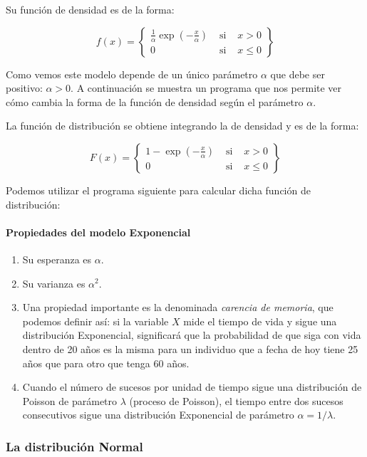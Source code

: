 \documentclass[
]{article}
\begin{document}
Su función de densidad es de la forma:

\[
f(x)=\left\{\begin{array}{lll}
\frac{1}{\alpha} \exp \left(-\frac{x}{\alpha}\right) & \text { si } & x>0 \\
0 & \text { si } & x \leq 0
\end{array}\right\}
\]

Como vemos este modelo depende de un único parámetro \(\alpha\) que debe ser positivo: \(\alpha>0\). A continuación se muestra un programa que nos permite ver cómo cambia la forma de la función de densidad según el parámetro \(\alpha\).

La función de distribución se obtiene integrando la de densidad y es de la forma:

\[
F(x)=\left\{\begin{array}{lll}
1-\exp \left(-\frac{x}{\alpha}\right) & \text { si } & x>0 \\
0 & \text { si } & x \leq 0
\end{array}\right\}
\]

Podemos utilizar el programa siguiente para calcular dicha función de distribución:

\paragraph{Propiedades del modelo Exponencial}\label{propiedades-del-modelo-exponencial}

\begin{enumerate}
\def\labelenumi{\arabic{enumi}.}
\item
  Su esperanza es \(\alpha\).
\item
  Su varianza es \(\alpha^{2}\).
\item
  Una propiedad importante es la denominada \emph{carencia de memoria}, que podemos definir así: si la variable \(X\) mide el tiempo de vida y sigue una distribución Exponencial, significará que la probabilidad de que siga con vida dentro de 20 años es la misma para un individuo que a fecha de hoy tiene 25 años que para otro que tenga 60 años.
\item
  Cuando el número de sucesos por unidad de tiempo sigue una distribución de Poisson de parámetro \(\lambda\) (proceso de Poisson), el tiempo entre dos sucesos consecutivos sigue una distribución Exponencial de parámetro \(\alpha=1 / \lambda\).
\end{enumerate}

\subsubsection{La distribución Normal}\label{la-distribuciuxf3n-normal}
\end{document}
